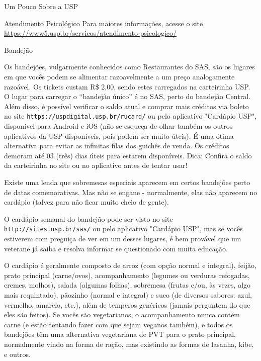 \begin{secao}{Um Pouco Sobre a USP}
\begin{subsecao}{Atendimento Psicológico}
Para maiores informações, acesse o site
\url{https://www5.usp.br/servicos/atendimento-psicologico/}

\end{subsecao}
\pagebreak

\begin{subsecao}{Bandejão}


Os bandejões, vulgarmente conhecidos como Restaurantes do SAS, são os lugares
em que vocês podem se alimentar razoavelmente a um preço analogamente razoável.
Os tickets custam R\$ 2,00, sendo estes carregados na carteirinha USP. O
lugar para carregar o ``bandejão único'' é no SAS, perto do bandejão
Central. Além disso, é possível verificar o saldo
atual e comprar mais créditos via boleto no site
{\tt https://uspdigital.usp.br/rucard/} ou pelo aplicativo "Cardápio USP",
disponível para Android e iOS (não se esqueça de olhar também os outros
aplicativos da USP disponíveis, pois podem ser muito úteis).
É uma ótima alternativa para evitar as infinitas filas dos guichês de venda. Os
créditos demoram até 03 (três) dias úteis para estarem disponíveis.
Dica: Confira o saldo da carteirinha no site ou no aplicativo antes de tentar usar!

Existe uma lenda que sobremesas especiais aparecem em certos bandejões perto de
datas comemorativas. Mas não se engane - normalmente, elas não aparecem no
cardápio (talvez para não ficar muito cheio de gente).


O cardápio semanal do bandejão pode ser visto no site {\tt
http://sites.usp.br/sas/} ou pelo aplicativo "Cardápio USP", mas se vocês
estiverem com preguiça de ver em um desses lugares, é
bem provável que um veterane já saiba e resolva informar se questionado com muita
educação.

O cardápio é geralmente composto de arroz (com opção normal e integral), feijão,
prato principal (carne/ovos), acompanhamento (legumes ou verduras refogadas,
cremes, molhos), salada (algumas folhas), sobremesa (frutas e/ou, às vezes, algo mais
requintado), pãozinho (normal e integral) e suco (de diversos sabores: azul, vermelho,
amarelo, etc.), além de temperos genéricos
(jamais perguntem do que eles são feitos). Se vocês são vegetarianos, o
acompanhamento nunca contém carne (e estão tentando fazer com que sejam veganos
também), e todos os bandejões têm uma alternativa vegetariana de PVT para o
prato principal, normalmente vindo na forma de ração, mas existindo as formas
de lasanha, kibe, e outros.



\end{subsecao}
\end{secao}
